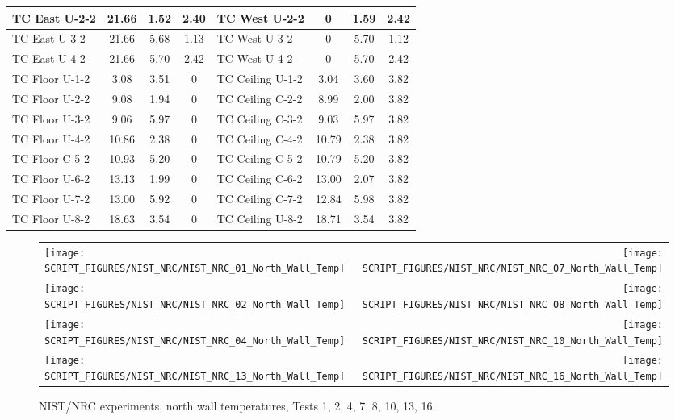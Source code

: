 \begin{table}[ht]
\begin{center}
\begin{tabular}{|l|c|c|c||l|c|c|c|}
TC East U-2-2     & 21.66 & 1.52 & 2.40     & TC West U-2-2     & 0     & 1.59  & 2.42      \\ \hline
TC East U-3-2     & 21.66 & 5.68 & 1.13     & TC West U-3-2     & 0     & 5.70  & 1.12      \\ \hline
TC East U-4-2     & 21.66 & 5.70 & 2.42     & TC West U-4-2     & 0     & 5.70  & 2.42      \\ \hline \hline
TC Floor U-1-2    & 3.08  & 3.51 & 0        & TC Ceiling U-1-2  & 3.04  & 3.60  & 3.82      \\ \hline
TC Floor U-2-2    & 9.08  & 1.94 & 0        & TC Ceiling C-2-2  & 8.99  & 2.00  & 3.82      \\ \hline
TC Floor U-3-2    & 9.06  & 5.97 & 0        & TC Ceiling C-3-2  & 9.03  & 5.97  & 3.82      \\ \hline
TC Floor U-4-2    & 10.86 & 2.38 & 0        & TC Ceiling C-4-2  & 10.79 & 2.38  & 3.82      \\ \hline
TC Floor C-5-2    & 10.93 & 5.20 & 0        & TC Ceiling C-5-2  & 10.79 & 5.20  & 3.82      \\ \hline
TC Floor U-6-2    & 13.13 & 1.99 & 0        & TC Ceiling C-6-2  & 13.00 & 2.07  & 3.82      \\ \hline
TC Floor U-7-2    & 13.00 & 5.92 & 0        & TC Ceiling C-7-2  & 12.84 & 5.98  & 3.82      \\ \hline
TC Floor U-8-2    & 18.63 & 3.54 & 0        & TC Ceiling U-8-2  & 18.71 & 3.54  & 3.82      \\ \hline
\end{tabular}
\end{center}
\label{NIST_NRC_Wall_Coords}
\end{table}

\newpage

\begin{figure}[p]
\begin{tabular*}{\textwidth}{l@{\extracolsep{\fill}}r}
\texttt{[image: SCRIPT\_FIGURES/NIST\_NRC/NIST\_NRC\_01\_North\_Wall\_Temp]} &
\texttt{[image: SCRIPT\_FIGURES/NIST\_NRC/NIST\_NRC\_07\_North\_Wall\_Temp]} \\
\texttt{[image: SCRIPT\_FIGURES/NIST\_NRC/NIST\_NRC\_02\_North\_Wall\_Temp]} &
\texttt{[image: SCRIPT\_FIGURES/NIST\_NRC/NIST\_NRC\_08\_North\_Wall\_Temp]} \\
\texttt{[image: SCRIPT\_FIGURES/NIST\_NRC/NIST\_NRC\_04\_North\_Wall\_Temp]} &
\texttt{[image: SCRIPT\_FIGURES/NIST\_NRC/NIST\_NRC\_10\_North\_Wall\_Temp]} \\
\texttt{[image: SCRIPT\_FIGURES/NIST\_NRC/NIST\_NRC\_13\_North\_Wall\_Temp]} &
\texttt{[image: SCRIPT\_FIGURES/NIST\_NRC/NIST\_NRC\_16\_North\_Wall\_Temp]}
\end{tabular*}
\caption{NIST/NRC experiments, north wall temperatures, Tests 1, 2, 4, 7, 8, 10, 13, 16.}
\label{NIST_NRC_North_Wall_Temp_Closed}
\end{figure}

